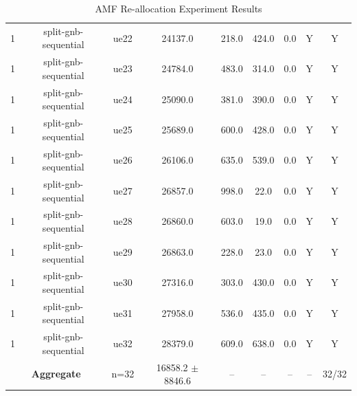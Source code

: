 \begin{table}[ht]
\begin{tabular}{|c|c|c|c|c|c|c|c|c|}
1 & split-gnb-sequential & ue22 & 24137.0 & 218.0 & 424.0 & 0.0 & Y & Y \\
1 & split-gnb-sequential & ue23 & 24784.0 & 483.0 & 314.0 & 0.0 & Y & Y \\
1 & split-gnb-sequential & ue24 & 25090.0 & 381.0 & 390.0 & 0.0 & Y & Y \\
1 & split-gnb-sequential & ue25 & 25689.0 & 600.0 & 428.0 & 0.0 & Y & Y \\
1 & split-gnb-sequential & ue26 & 26106.0 & 635.0 & 539.0 & 0.0 & Y & Y \\
1 & split-gnb-sequential & ue27 & 26857.0 & 998.0 & 22.0 & 0.0 & Y & Y \\
1 & split-gnb-sequential & ue28 & 26860.0 & 603.0 & 19.0 & 0.0 & Y & Y \\
1 & split-gnb-sequential & ue29 & 26863.0 & 228.0 & 23.0 & 0.0 & Y & Y \\
1 & split-gnb-sequential & ue30 & 27316.0 & 303.0 & 430.0 & 0.0 & Y & Y \\
1 & split-gnb-sequential & ue31 & 27958.0 & 536.0 & 435.0 & 0.0 & Y & Y \\
1 & split-gnb-sequential & ue32 & 28379.0 & 609.0 & 638.0 & 0.0 & Y & Y \\
\multicolumn{2}{|c|}{\textbf{Aggregate}} & n=32 & 16858.2 $\pm$ 8846.6 & -- & -- & -- & -- & 32/32 \\
\hline
\end{tabular}
\caption{AMF Re-allocation Experiment Results}
\label{tab:amf_realloc}
\end{table}
